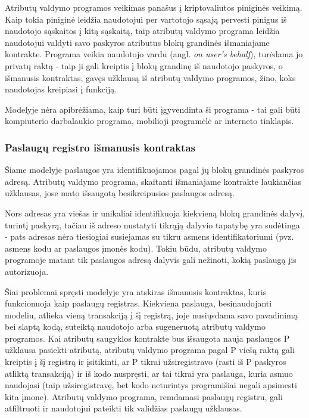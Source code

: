 Atributų valdymo programos veikimas panašus į kriptovaliutos piniginės veikimą. Kaip tokia piniginė leidžia naudotojui per vartotojo sąsają
pervesti pinigus iš naudotojo sąskaitos į kitą sąskaitą, taip atributų valdymo programa leidžia naudotojui
valdyti savo paskyros atributus blokų grandinės išmaniajame kontrakte. Programa veikia naudotojo vardu (angl. \textit{on user's behalf}),
turėdama jo privatų raktą
- taip ji gali kreiptis į blokų grandinę
iš naudotojo paskyros, o išmanusis kontraktas, gavęs užklausą iš atributų valdymo programos,
žino, koks naudotojas kreipiasi į funkciją.

Modelyje nėra apibrėžiama, kaip turi būti įgyvendinta ši programa - tai gali būti kompiuterio darbalaukio programa,
mobilioji programėlė ar interneto tinklapis. 

\subsubsection{Paslaugų registro išmanusis kontraktas} \label{BCIDM:serviceRegister}

Šiame modelyje paslaugos yra identifikuojamos pagal jų blokų grandinės paskyros adresą. Atributų valdymo programa,
skaitanti išmaniajame kontrakte laukiančias užklausas, jose mato išsaugotą besikreipusios paslaugos adresą.

Nors adresas yra viešas ir unikaliai identifikuoja kiekvieną blokų grandinės dalyvį, turintį paskyrą, tačiau iš adreso nustatyti tikrąją dalyvio tapatybę yra sudėtinga -
pats adresas nėra tiesiogiai susiejamas su tikru asmens identifikatoriumi (pvz. asmens kodu ar paslaugos įmonės kodu).
Tokiu būdu, atributų valdymo programoje matant tik paslaugos adresą dalyvis gali nežinoti, kokią paslaugą jis autorizuoja.

Šiai problemai spręsti modelyje yra atskiras išmanusis kontraktas, kuris funkcionuoja kaip paslaugų registras. Kiekviena
paslauga, besinaudojanti modeliu, atlieka vieną transakciją į šį registrą, joje nusiųsdama savo pavadinimą bei slaptą kodą,
suteiktą naudotojo arba sugeneruotą atributų valdymo programos. Kai atributų saugyklos kontrakte bus išsaugota nauja paslaugos
P užklausa pasiekti atributą, atributų valdymo programa pagal P viešą raktą gali kreiptis
į šį registrą ir įsitikinti, ar P tikrai užsiregistravo (rasti iš P paskyros atliktą transakciją) ir iš kodo
nuspręsti, ar tai tikrai yra paslauga, kuria asmuo naudojasi (taip užsiregistravę, bet kodo neturintys programišiai negali
apsimesti kita įmone). Atributų valdymo programa, remdamasi paslaugų registru, gali atfiltruoti ir naudotojui pateikti tik
validžias paslaugų užklausas.

